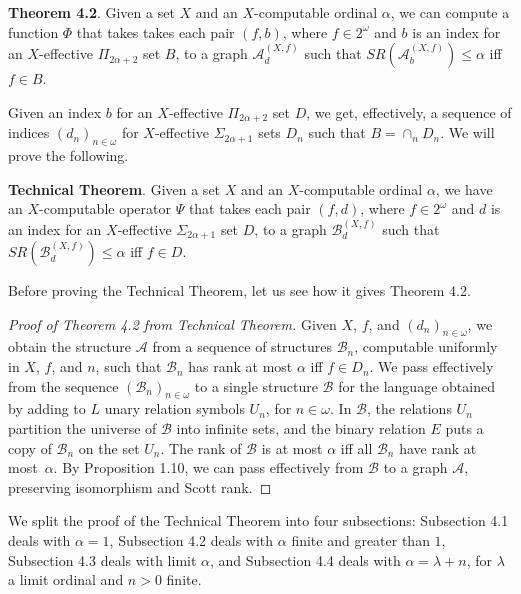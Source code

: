 \documentclass{article}
\begin{document}
\bigskip
\noindent
\textbf{Theorem 4.2}.  Given a set $X$ and an $X$-computable ordinal $\alpha$, we can compute a function $\Phi$ that takes takes each pair $(f,b)$, where $f\in 2^\omega$ and $b$ is an index for an $X$-effective $\Pi_{2\alpha+2}$ set $B$, to a graph $\mathcal{A}^{(X,f)}_d$ such that $SR(\mathcal{A}^{(X,f)}_b)\leq\alpha$ iff $f\in B$. 

\bigskip 

Given an index $b$ for an $X$-effective $\Pi_{2\alpha+2}$ set $D$, we get, effectively, a sequence of indices $(d_n)_{n\in\omega}$ for $X$-effective $\Sigma_{2\alpha+1}$ sets $D_n$ such that $B = \cap_n 
D_n$.  We will prove the following.  

\bigskip
\noindent
\textbf{Technical Theorem}.  Given a set $X$ and an $X$-computable ordinal $\alpha$, we have an $X$-computable operator $\Psi$ that takes each pair $(f,d)$, where $f\in 2^\omega$ and $d$ is an index for an $X$-effective $\Sigma_{2\alpha+1}$ set $D$, to a graph $\mathcal{B}^{(X,f)}_d$ such that $SR(\mathcal{B}^{(X,f)}_d)\leq\alpha$ iff $f\in D$.   

\bigskip

Before proving the Technical Theorem, let us see how it gives Theorem 4.2.

\begin{proof} [Proof of Theorem 4.2 from Technical Theorem]

Given $X$, $f$, and $(d_n)_{n\in\omega}$, we obtain the structure $\mathcal{A}$ from a sequence of structures $\mathcal{B}_n$, computable uniformly in $X$, $f$, and $n$, such that $\mathcal{B}_n$ has rank at most $\alpha$ iff $f\in D_n$.  We pass effectively from the sequence $(\mathcal{B}_n)_{n\in\omega}$ to a single structure $\mathcal{B}$ for the language obtained by adding to $L$ unary relation symbols $U_n$, for $n\in\omega$.  In $\mathcal{B}$, the relations $U_n$ partition the universe of $\mathcal{B}$ into infinite sets, and the binary relation $E$ puts a copy of $\mathcal{B}_n$ on the set $U_n$.  The rank of $\mathcal{B}$ is at most $\alpha$ iff all $\mathcal{B}_n$ have rank at most~$\alpha$.  
By Proposition 1.10, we can pass effectively from $\mathcal{B}$ to a graph $\mathcal{A}$, preserving isomorphism and Scott rank.  
\end{proof}  

We split the proof of the Technical Theorem into four subsections: Subsection 4.1 deals with 
$\alpha = 1$, Subsection 4.2 deals with $\alpha$ finite and greater than $1$, Subsection 4.3 deals with limit $\alpha$, and Subsection 4.4 deals with $\alpha = \lambda + n$, for $\lambda$ a limit ordinal and $n > 0$ finite.   
\end{document}
